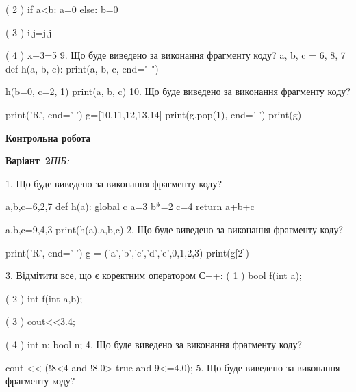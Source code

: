 \documentclass[11pt]{article}
\begin{document}
( 2 ) if a<b: a=0 else: b=0

( 3 ) i,j=j,j

( 4 ) x+3=5
\vspace{5mm}
9. Що буде виведено за виконання фрагменту коду?
a, b, c = 6, 8, 7
def h(a, b, c):
    print(a, b, c, end=" ")

h(b=0, c=2, 1)
print(a, b, c)
\vspace{5mm}
10. Що буде виведено за виконання фрагменту коду?

print('R', end=' ')
g=[10,11,12,13,14]
print(g.pop(1), end=' ')
print(g)

\vspace{5mm}










\newpage

\newpage

{\large\textbf{Контрольна робота}}

\textbf{Варіант \No\,2}\hfill \textit{ПІБ:}\,\underline{\hspace{60mm}}
\vspace{4mm}

1. Що буде виведено за виконання фрагменту коду?

a,b,c=6,2,7
def h(a):
global c    a=3
    b*=2
    c=4
    return a+b+c

a,b,c=9,4,3
print(h(a),a,b,c)
\vspace{5mm}
2. Що буде виведено за виконання фрагменту коду?

print('R', end=' ')
g = ('a','b','c','d','e',0,1,2,3)
print(g[2])

\vspace{5mm}
3. %
Відмітити все, що є коректним оператором С++:
( 1 ) bool f(int a);

( 2 ) int f(int a,b);

( 3 ) cout<<3.4;

( 4 ) int n; bool n;
\vspace{5mm}
4. Що буде виведено за виконання фрагменту коду?

cout << (!8<4 and !8.0> true and 9<=4.0);
\vspace{5mm}
5. Що буде виведено за виконання фрагменту коду?
\end{document}
